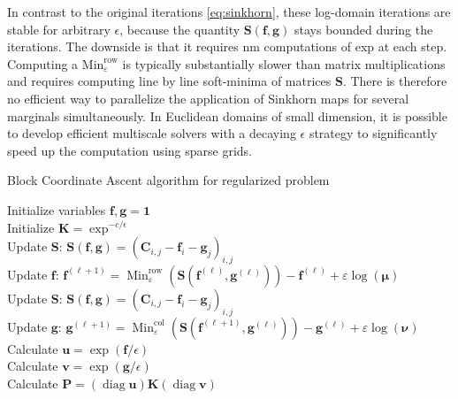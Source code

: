 In contrast to the original iterations \ref{eq:sinkhorn}, these log-domain iterations
are stable for arbitrary $\epsilon$, because the quantity $\mathbf{S}(\mathbf{f}, \mathbf{g})$ stays bounded during the
iterations. The downside is that it requires nm computations of exp at each step. Computing a $\mathrm{Min}_{\varepsilon}^{\mathrm{row}}$ is typically substantially slower than matrix multiplications
and requires computing line by line soft-minima of matrices $\mathbf{S}$. There is therefore no
efficient way to parallelize the application of Sinkhorn maps for several marginals simultaneously. In Euclidean domains of small dimension, it is possible to develop efficient
multiscale solvers with a decaying $\epsilon$ strategy to significantly speed up the computation
using sparse grids.

\vspace{2ex}
    \begin{algorithm}[htbp]
        \SetAlgoNoLine
        \caption{Block Coordinate Ascent algorithm for regularized problem} 
        Initialize variables $\mathbf{f}, \mathbf{g} = \boldsymbol{1}$\\
        Initialize  $\mathbf{K} = \exp^{-c/\epsilon}$\\
        {  
          Update $\mathbf{S}$: $\mathbf{S}(\mathbf{f}, \mathbf{g})=\left(\mathbf{C}_{i, j}-\mathbf{f}_{i}-\mathbf{g}_{j}\right)_{i, j}$\\
          Update $\mathbf{f}$: ${\mathbf{f}^{(\ell+1)}=\operatorname{Min}_{\varepsilon}^{\mathrm{row}}\left(\mathbf{S}\left(\mathbf{f}^{(\ell)}, \mathbf{g}^{(\ell)}\right)\right)-\mathbf{f}^{(\ell)}+\varepsilon \log (\mathbf{\mu})}$\\
          Update $\mathbf{S}$: $\mathbf{S}(\mathbf{f}, \mathbf{g})=\left(\mathbf{C}_{i, j}-\mathbf{f}_{i}-\mathbf{g}_{j}\right)_{i, j}$\\
          Update $\mathbf{g}$: ${\mathbf{g}^{(\ell+1)}=\operatorname{Min}_{\varepsilon}^{\mathrm{col}}\left(\mathbf{S}\left(\mathbf{f}^{(\ell+1)}, \mathbf{g}^{(\ell)}\right)\right)-\mathbf{g}^{(\ell)}+\varepsilon \log (\mathbf{\nu})}$\\
        }
        Calculate $\mathbf{u} = \exp(\mathbf{f}/\epsilon)$\\
        Calculate $\mathbf{v} = \exp(\mathbf{g}/\epsilon)$\\
        Calculate $\mathbf{P} = (\operatorname{diag}{\mathbf{u}}) \mathbf{K} (\operatorname{diag}{\mathbf{v}})$\\
    \end{algorithm}